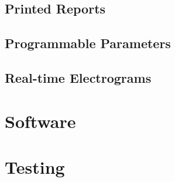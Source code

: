 \documentclass[12pt]{article}
\begin{document}
\subsection{Printed Reports}

\subsection{Programmable Parameters}

\subsection{Real-time Electrograms}

\newpage
\section{Software}
\subsection{}

\newpage
\section{Testing}
\end{document}
